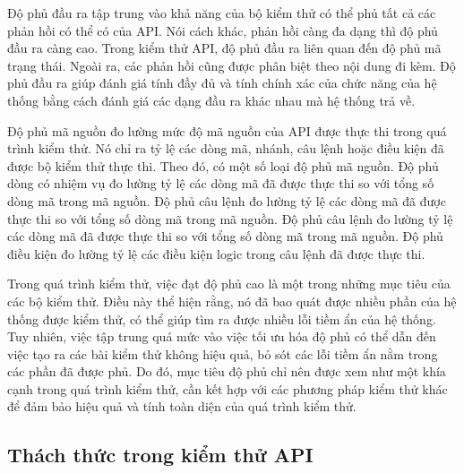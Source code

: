 Độ phủ đầu ra tập trung vào khả năng của bộ kiểm thử có thể phủ tất cả các phản hồi có thể có của API. Nói cách khác, phản hồi càng đa dạng thì độ phủ đầu ra càng cao. Trong kiểm thử API, độ phủ đầu ra liên quan đến độ phủ mã trạng thái. Ngoài ra, các phản hồi cũng được phân biệt theo nội dung đi kèm. Độ phủ đầu ra giúp đánh giá tính đầy đủ và tính chính xác của chức năng của hệ thống bằng cách đánh giá các dạng đầu ra khác nhau mà hệ thống trả về.

Độ phủ mã nguồn đo lường mức độ  mã nguồn của API được thực thi trong quá trình kiểm thử. Nó chỉ ra tỷ lệ các dòng mã, nhánh, câu lệnh hoặc điều kiện đã được bộ kiểm thử thực thi. Theo đó, có một số loại độ phủ mã nguồn. Độ phủ dòng có nhiệm vụ đo lường tỷ lệ các dòng mã đã được thực thi so với tổng số dòng mã trong mã nguồn. Độ phủ câu lệnh đo lường tỷ lệ các dòng mã đã được thực thi so với tổng số dòng mã trong mã nguồn. Độ phủ câu lệnh đo lường tỷ lệ các dòng mã đã được thực thi so với tổng số dòng mã trong mã nguồn. Độ phủ điều kiện đo lường tỷ lệ các điều kiện logic trong câu lệnh đã được thực thi.

Trong quá trình kiểm thử, việc đạt độ phủ cao là một trong những mục tiêu của các bộ kiểm thử. Điều này thể hiện rằng, nó đã bao quát được nhiều phần của hệ thống được kiểm thử, có thể giúp tìm ra được nhiều lỗi tiềm ẩn của hệ thống. Tuy nhiên, việc tập trung quá mức vào việc tối ưu hóa độ phủ có thể dẫn đến việc tạo ra các bài kiểm thử không hiệu quả, bỏ sót các lỗi tiềm ẩn nằm trong các phần đã được phủ. Do đó, mục tiêu độ phủ chỉ nên được xem như một khía cạnh trong quá trình kiểm thử, cần kết hợp với các phương pháp kiểm thử khác để đảm bảo hiệu quả và tính toàn diện của quá trình kiểm thử.

\subsection{Thách thức trong kiểm thử  API}


